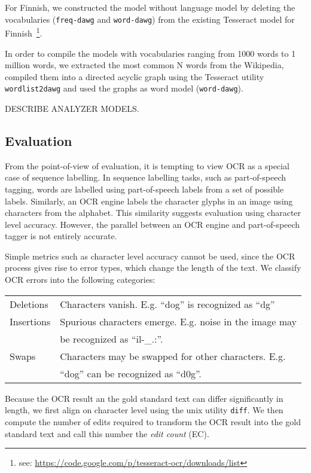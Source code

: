 \documentclass[b5paper]{article}
\begin{document}
For Finnish, we constructed the model without language model by
deleting the vocabularies ({\tt freq-dawg} and {\tt word-dawg}) from
the existing Tesseract model for Finnish~\footnote{see:
  \url{https://code.google.com/p/tesseract-ocr/downloads/list}}.

In order to compile the models with vocabularies ranging from 1000
words to 1 million words, we extracted the most common N words from
the Wikipedia, compiled them into a directed acyclic graph using the
Tesseract utility {\tt wordlist2dawg} and used the graphs as word
model ({\tt word-dawg}).

DESCRIBE ANALYZER MODELS.

\subsection{Evaluation}
From the point-of-view of evaluation, it is tempting to view OCR as a
special case of sequence labelling. In sequence labelling tasks, such
as part-of-speech tagging, words are labelled using part-of-speech
labels from a set of possible labels. Similarly, an OCR engine labels
the character glyphs in an image using characters from the
alphabet. This similarity suggests evaluation using character level
accuracy. However, the parallel between an OCR engine and
part-of-speech tagger is not entirely accurate.

Simple metrics such as character level accuracy cannot be used, since
the OCR process gives rise to error types, which change the length of
the text. We classify OCR errors into the following categories:
\begin{center}
\begin{tabular}{ll}
Deletions  & Characters vanish. E.g. ``dog'' is recognized as ``dg''\\
Insertions & Spurious characters emerge. E.g. noise in the image may \\
           & be recognized as ``il-\_.:''.\\ 
Swaps      & Characters may be swapped for other characters. E.g. \\
           & ``dog'' can be recognized as ``d0g''.
\end{tabular}
\end{center}

Because the OCR result an the gold standard text can differ
significantly in length, we first align on character level using the
unix utility {\tt diff}. We then compute the number of edits required
to transform the OCR result into the gold standard text and call this
number the {\it edit count} (EC).
\end{document}
